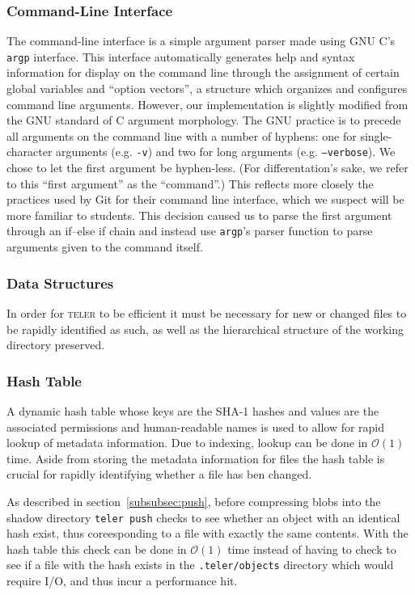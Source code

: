 \documentclass[12pt, letterpaper]{article}
\begin{document}
\begin{multicols}{2}
  \subsubsection{Command-Line Interface}
  \label{subsec:cli}

  The command-line interface is a simple argument parser made using
  GNU C's \texttt{argp} interface. This interface automatically
  generates help and syntax information for display on the command
  line through the assignment of certain global variables and ``option
  vectors'', a structure which organizes and configures command line
  arguments. However, our implementation is slightly modified from the
  GNU standard of C argument morphology. The GNU practice is to
  precede all arguments on the command line with a number of hyphens:
  one for single-character arguments (e.g. \texttt{-v}) and two for
  long arguments (e.g. \texttt{--verbose}). We chose to let the first
  argument be hyphen-less. (For differentation's sake, we refer to
  this ``first argument'' as the ``command''.) This reflects more
  closely the practices used by Git for their command line interface,
  which we suspect will be more familiar to students. This decision
  caused us to parse the first argument through an if--else if chain
  and instead use \texttt{argp}'s parser function to parse arguments
  given to the command itself.

  \subsubsection{Data Structures}
  \label{subsec:datastructures}
  In order for \textsc{teler} to be efficient it must be necessary for
  new or changed files to be rapidly identified as such, as well as
  the hierarchical structure of the working directory preserved.

  \subsubsection{Hash Table}
  \label{subsubsec:datastructures}

  A dynamic hash table whose keys are the SHA-1 hashes and values are
  the associated permissions and human-readable names is used to allow
  for rapid lookup of metadata information. Due to indexing, lookup
  can be done in $\mathcal{O}(1)$ time. Aside from storing the
  metadata information for files the hash table is crucial for rapidly
  identifying whether a file has ben changed.

  As described in section~\ref{subsubsec:push}, before compressing
  blobs into the shadow directory \texttt{teler push} checks to see
  whether an object with an identical hash exist, thus coreesponding
  to a file with exactly the same contents. With the hash table this
  check can be done in $\mathcal{O}(1)$ time instead of having to
  check to see if a file with the hash exists in the
  \texttt{.teler/objects} directory which would require I/O, and thus
  incur a performance hit.


\end{multicols}
\end{document}
